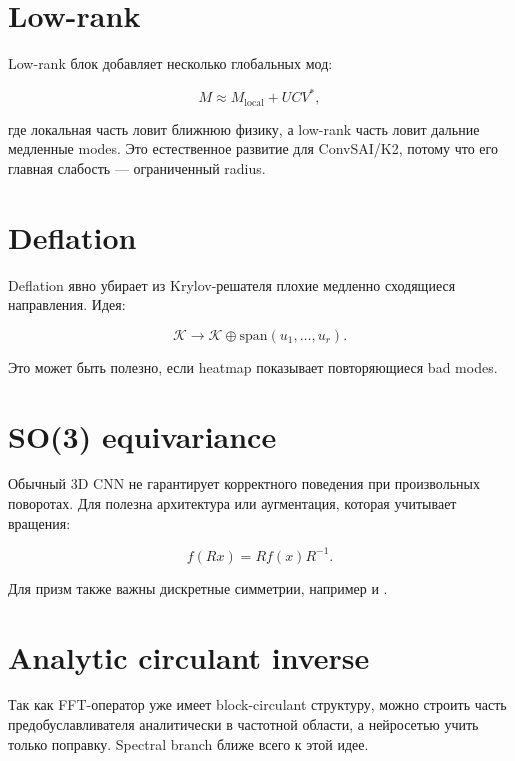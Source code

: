 \documentclass[11pt,a4paper,oneside]{book}
\newcommand{\code}[1]{\texttt{\detokenize{#1}}}
\begin{document}
\section{Low-rank}

Low-rank блок добавляет несколько глобальных мод:

\begin{equation}
  M \approx M_{\mathrm{local}} + U C V^*,
\end{equation}

где локальная часть ловит ближнюю физику, а low-rank часть ловит дальние
медленные modes. Это естественное развитие для ConvSAI/K2, потому что его
главная слабость --- ограниченный radius.

\section{Deflation}

Deflation явно убирает из Krylov-решателя плохие медленно сходящиеся
направления. Идея:

\begin{equation}
  \mathcal{K} \rightarrow \mathcal{K} \oplus \mathrm{span}(u_1,\dots,u_r).
\end{equation}

Это может быть полезно, если heatmap показывает повторяющиеся bad modes.

\section{SO(3) equivariance}

Обычный 3D CNN не гарантирует корректного поведения при произвольных
поворотах. Для \code{-orient avg} полезна архитектура или аугментация, которая
учитывает вращения:

\begin{equation}
  f(Rx) = R f(x) R^{-1}.
\end{equation}

Для призм также важны дискретные симметрии, например \code{z180} и
\code{zflip}.

\section{Analytic circulant inverse}

Так как FFT-оператор уже имеет block-circulant структуру, можно строить часть
предобуславливателя аналитически в частотной области, а нейросетью учить
только поправку. Spectral branch ближе всего к этой идее.
\end{document}
